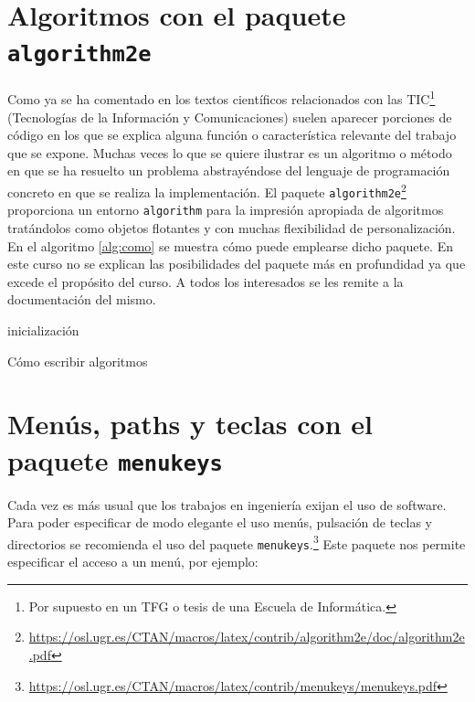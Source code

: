 \documentclass[ 		%
	11pt,				%
	a4paper,			%
	twoside,			%
	openright,			%
	final       		%
]{book}
\begin{document}
\section{Algoritmos con el paquete \texttt{algorithm2e}}
Como ya se ha comentado en los textos científicos relacionados con las TIC\footnote{Por supuesto en un TFG o tesis de una Escuela de Informática.} (Tecnologías de la Información y Comunicaciones) suelen aparecer porciones de código en los que se explica alguna función o característica relevante del trabajo que se expone. Muchas veces lo que se quiere ilustrar es un algoritmo o método en que se ha resuelto un problema abstrayéndose del lenguaje de programación concreto en que se realiza la implementación. El paquete \texttt{algorithm2e}\footnote{\url{https://osl.ugr.es/CTAN/macros/latex/contrib/algorithm2e/doc/algorithm2e.pdf}} proporciona un entorno \texttt{algorithm} para la impresión apropiada de algoritmos tratándolos como objetos flotantes y con muchas flexibilidad de personalización. En el algoritmo \ref{alg:como} se muestra cómo puede emplearse dicho paquete. En este curso no se explican las posibilidades del paquete más en profundidad ya que excede el propósito del curso. A todos los interesados se les remite a la documentación del mismo.


\IncMargin{1em}
\begin{algorithm}
\LinesNumbered
\SetAlgoLined


inicialización\;

\caption{Cómo escribir algoritmos}\label{alg:como}
\end{algorithm}\DecMargin{1em}


\section{Menús, paths y teclas con el paquete \texttt{menukeys}}
Cada vez es más usual que los trabajos en ingeniería exijan el uso de 
software. Para poder especificar de modo elegante el uso menús, pulsación de 
teclas y directorios se recomienda el uso del paquete 
\texttt{menukeys}.\footnote{\url{https://osl.ugr.es/CTAN/macros/latex/contrib/menukeys/menukeys.pdf}}
  Este paquete nos permite especificar el acceso a un menú, por 
ejemplo:\\
\end{document}
